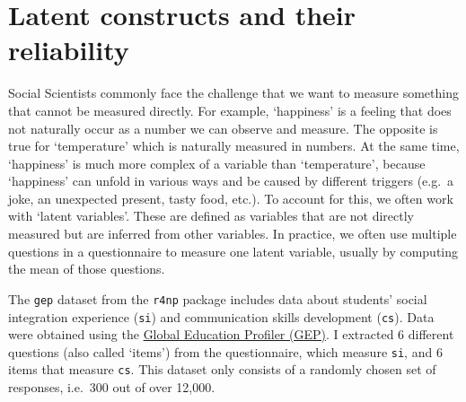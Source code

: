 \documentclass[
]{book}
\begin{document}
\hypertarget{latent-constructs}{%
\section{Latent constructs and their reliability}\label{latent-constructs}}

Social Scientists commonly face the challenge that we want to measure something that cannot be measured directly. For example, `happiness' is a feeling that does not naturally occur as a number we can observe and measure. The opposite is true for `temperature' which is naturally measured in numbers. At the same time, `happiness' is much more complex of a variable than `temperature', because `happiness' can unfold in various ways and be caused by different triggers (e.g.~a joke, an unexpected present, tasty food, etc.). To account for this, we often work with `latent variables'. These are defined as variables that are not directly measured but are inferred from other variables. In practice, we often use multiple questions in a questionnaire to measure one latent variable, usually by computing the mean of those questions.

The \texttt{gep} dataset from the \texttt{r4np} package includes data about students' social integration experience (\texttt{si}) and communication skills development (\texttt{cs}). Data were obtained using the \href{https://warwick.ac.uk/gep}{Global Education Profiler (GEP)}. I extracted 6 different questions (also called `items') from the questionnaire, which measure \texttt{si}, and 6 items that measure \texttt{cs}. This dataset only consists of a randomly chosen set of responses, i.e.~300 out of over 12,000.
\end{document}

